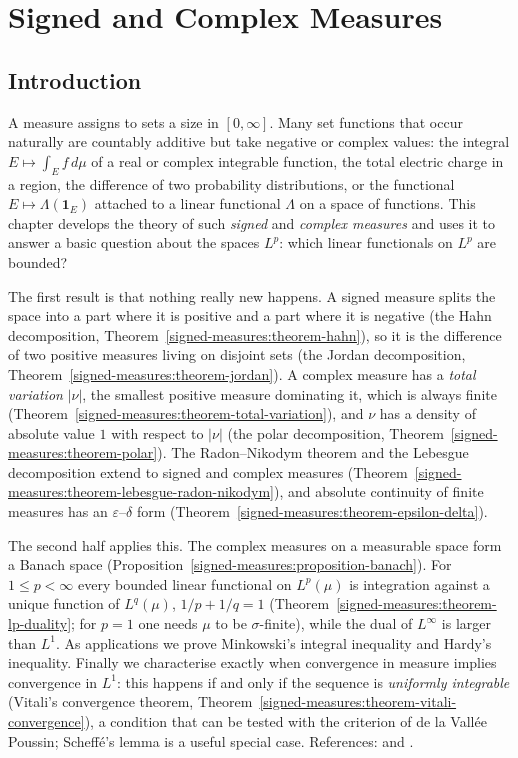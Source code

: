 \chapter{Signed and Complex Measures}\label{signed-measures}

\section{Introduction}\label{signed-measures:section-introduction}

A measure assigns to sets a size in $[0, \infty]$. Many set functions that occur naturally are countably additive but take negative or complex values: the integral
$E \mapsto \int_Ef\,d\mu$ of a real or complex integrable function, the total electric charge in a region, the difference of two probability distributions, or the functional
$E \mapsto \Lambda(\mathbf{1}_E)$ attached to a linear functional $\Lambda$ on a space of functions. This chapter develops the theory of such \emph{signed} and \emph{complex measures} and uses it
to answer a basic question about the spaces $L^p$: which linear functionals on $L^p$ are bounded?

The first result is that nothing really new happens. A signed measure splits the space into a part where it is positive and a part where it is negative (the Hahn decomposition,
Theorem~\ref{signed-measures:theorem-hahn}), so it is the difference of two positive measures living on disjoint sets (the Jordan decomposition, Theorem~\ref{signed-measures:theorem-jordan}). A
complex measure has a \emph{total variation} $|\nu|$, the smallest positive measure dominating it, which is always finite (Theorem~\ref{signed-measures:theorem-total-variation}), and
$\nu$ has a density of absolute value $1$ with respect to $|\nu|$ (the polar decomposition, Theorem~\ref{signed-measures:theorem-polar}). The Radon--Nikodym theorem and the Lebesgue decomposition
extend to signed and complex measures (Theorem~\ref{signed-measures:theorem-lebesgue-radon-nikodym}), and absolute continuity of finite measures has an $\varepsilon$--$\delta$ form
(Theorem~\ref{signed-measures:theorem-epsilon-delta}).

The second half applies this. The complex measures on a measurable space form a Banach space (Proposition~\ref{signed-measures:proposition-banach}). For $1 \leq p < \infty$ every bounded linear
functional on $L^p(\mu)$ is integration against a unique function of $L^q(\mu)$, $1/p + 1/q = 1$ (Theorem~\ref{signed-measures:theorem-lp-duality}; for $p = 1$ one needs $\mu$ to be $\sigma$-finite), while
the dual of $L^\infty$ is larger than $L^1$. As applications we prove Minkowski's integral inequality and Hardy's inequality. Finally we characterise exactly when convergence in measure implies
convergence in $L^1$: this happens if and only if the sequence is \emph{uniformly integrable} (Vitali's convergence theorem, Theorem~\ref{signed-measures:theorem-vitali-convergence}), a condition
that can be tested with the criterion of de la Vall\'ee Poussin; Scheff\'e's lemma is a useful special case.
References: \cite[Chapters 3 and 6]{folland-real} and \cite[Chapter 6]{rudin-rca}.

